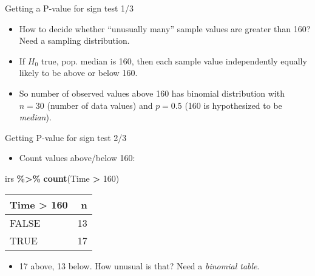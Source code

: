 \documentclass[
  ignorenonframetext,
]{beamer}
\newenvironment{Shaded}{\begin{snugshade}}{\end{snugshade}}
\newcommand{\DecValTok}[1]{\textcolor[rgb]{0.00,0.00,0.81}{#1}}
\newcommand{\KeywordTok}[1]{\textcolor[rgb]{0.13,0.29,0.53}{\textbf{#1}}}
\newcommand{\NormalTok}[1]{#1}
\newcommand{\OperatorTok}[1]{\textcolor[rgb]{0.81,0.36,0.00}{\textbf{#1}}}
\newcommand{\StringTok}[1]{\textcolor[rgb]{0.31,0.60,0.02}{#1}}
\providecommand{\tightlist}{%
  \setlength{\itemsep}{0pt}\setlength{\parskip}{0pt}}
\begin{document}
\begin{frame}{Getting a P-value for sign test 1/3}
\protect\hypertarget{getting-a-p-value-for-sign-test-13}{}
\begin{itemize}
\tightlist
\item
  How to decide whether ``unusually many'' sample values are greater
  than 160? Need a sampling distribution.
\item
  If \(H_0\) true, pop. median is 160, then each sample value
  independently equally likely to be above or below 160.
\item
  So number of observed values above 160 has binomial distribution with
  \(n = 30\) (number of data values) and \(p = 0.5\) (160 is
  hypothesized to be \emph{median}).
\end{itemize}
\end{frame}

\begin{frame}[fragile]{Getting P-value for sign test 2/3}
\protect\hypertarget{getting-p-value-for-sign-test-23}{}
\begin{itemize}
\tightlist
\item
  Count values above/below 160:
\end{itemize}

\begin{Shaded}
\begin{Highlighting}[]
\NormalTok{irs }\OperatorTok{\%\textgreater{}\%}\StringTok{ }\KeywordTok{count}\NormalTok{(Time }\OperatorTok{\textgreater{}}\StringTok{ }\DecValTok{160}\NormalTok{)}
\end{Highlighting}
\end{Shaded}

\begin{longtable}[]{@{}lr@{}}
\toprule
Time \textgreater{} 160 & n\tabularnewline
\midrule
\endhead
FALSE & 13\tabularnewline
TRUE & 17\tabularnewline
\bottomrule
\end{longtable}

\begin{itemize}
\tightlist
\item
  17 above, 13 below. How unusual is that? Need a \emph{binomial table}.
\end{itemize}
\end{frame}
\end{document}
